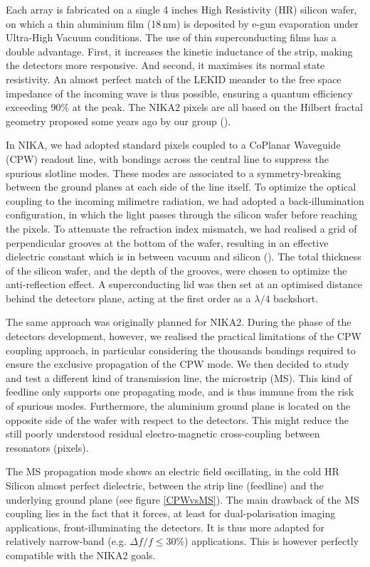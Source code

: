 \documentclass[]{aa} %
\begin{document}
Each array is fabricated on a single 4 inches High Resistivity (HR) silicon wafer, on which a thin aluminium film (18\,nm) is deposited by e-gun evaporation under Ultra-High Vacuum conditions. The use of thin superconducting films has a double advantage. First, it increases the kinetic inductance of the strip, making the detectors more responsive. And second, it maximises its normal state resistivity. An almost perfect match of the LEKID meander to the free space impedance of the incoming wave is thus possible, ensuring a quantum efficiency exceeding 90\% at the peak. The NIKA2 pixels are all based on the Hilbert fractal geometry proposed some years ago by our group (\cite{Roesch2012}). 

In NIKA, we had adopted standard pixels coupled to a CoPlanar Waveguide (CPW) readout line, with bondings across the central line to suppress the spurious slotline modes. These modes are associated to a symmetry-breaking between the ground planes at each side of the line itself. To optimize the optical coupling to the incoming milimetre radiation, we had adopted a back-illumination configuration, in which the light passes through the silicon wafer before reaching the pixels. To attenuate the refraction index mismatch, we had realised a grid of perpendicular grooves at the bottom of the wafer, resulting in an effective dielectric constant which is in between vacuum and silicon (\cite{Goupy2016}). The total thickness of the silicon wafer, and the depth of the grooves, were chosen to optimize the anti-reflection effect. A superconducting lid was then set at an optimised distance behind the detectors plane, acting at the first order as a $\lambda/4$ backshort. 

The same approach was originally planned for NIKA2. During the phase of the detectors development, however, we realised the practical limitations of the CPW coupling approach, in particular considering the thousands bondings required to ensure the exclusive propagation of the CPW mode. We then decided to study and test a different kind of transmission line, the microstrip (MS). This kind of feedline only supports one propagating mode, and is thus immune from the risk of spurious modes. Furthermore, the aluminium ground plane is located on the opposite side of the wafer with respect to the detectors. This might reduce the still poorly understood residual electro-magnetic cross-coupling between resonators (pixels).

The MS propagation mode shows an electric field oscillating, in the cold HR Silicon almost perfect dielectric, between the strip line (feedline) and the underlying ground plane (see figure  \ref{CPWvsMS}). The main drawback of the MS coupling lies in the fact that it forces, at least for dual-polarisation imaging applications, front-illuminating the detectors. It is thus more adapted for relatively narrow-band (e.g. $\Delta f / f  \leq 30 \%$) applications. This is however perfectly compatible with the NIKA2 goals.  
\end{document}
